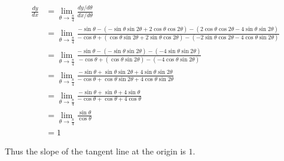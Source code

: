\begin{align*}
\frac{dy}{dx} &= \lim_{\theta \rightarrow \frac{\pi}{4}} \frac{dy/d\theta}{dx/d\theta} \\
&=  \lim_{\theta \rightarrow \frac{\pi}{4}} \frac{-\sin \theta - (-\sin \theta \sin 2\theta + 2 \cos \theta \cos 2\theta) - (2 \cos \theta \cos 2\theta - 4 \sin \theta \sin 2\theta)}{-\cos \theta + (\cos \theta \sin 2\theta + 2 \sin \theta \cos 2\theta) - (-2 \sin \theta \cos 2\theta - 4 \cos \theta \sin 2\theta)} \\
&= \lim_{\theta \rightarrow \frac{\pi}{4}} \frac{-\sin \theta - (-\sin \theta \sin 2\theta) - (-4 \sin \theta \sin 2\theta)}{-\cos \theta + (\cos \theta \sin 2\theta) - (- 4 \cos \theta \sin 2\theta)} \\
&= \lim_{\theta \rightarrow \frac{\pi}{4}} \frac{-\sin \theta + \sin \theta \sin 2\theta + 4 \sin \theta \sin 2\theta}{-\cos \theta + \cos \theta \sin 2\theta + 4 \cos \theta \sin 2\theta} \\
&= \lim_{\theta \rightarrow \frac{\pi}{4}} \frac{-\sin \theta + \sin \theta + 4 \sin \theta}{-\cos \theta + \cos \theta + 4 \cos \theta} \\
&= \lim_{\theta \rightarrow \frac{\pi}{4}} \frac{\sin \theta}{\cos \theta} \\
&= \boxed{1}
\end{align*}

Thus the slope of the tangent line at the origin is $\boxed{1}$.

